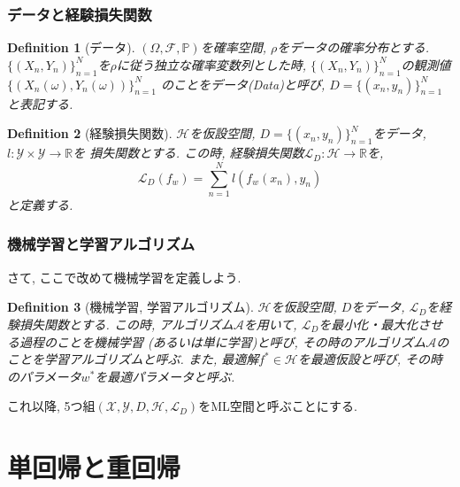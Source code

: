 \documentclass[dvipdfmx,11pt]{beamer}		%
\newtheorem{defi}{Definition}
\newcommand{\R}{\mathbb{R}}
\newcommand{\X}{\mathcal{X}}
\newcommand{\Y}{\mathcal{Y}}
\newcommand{\Hil}{\mathcal{H}}
\newcommand{\Loss}{\mathcal{L}_{D}}
\begin{document}
    \begin{frame}
        \frametitle{データと経験損失関数}
        \begin{defi}[データ]
            $(\Omega, \mathcal{F}, \mathbb{P})$を確率空間, $\rho$をデータの確率分布とする.
            $\{(X_n, Y_n)\}_{n = 1}^{N}$を$\rho$に従う独立な確率変数列とした時, $\{(X_n, Y_n)\}_{n = 1}^{N}$の観測値$\{(X_n(\omega), Y_n(\omega))\}_{n = 1}^{N}$
            のことをデータ(Data)と呼び, $D = \{(x_n, y_n)\}_{n = 1}^{N}$と表記する.
        \end{defi}
        \begin{defi}[経験損失関数]
            $\Hil$を仮設空間, $D = \{(x_n, y_n)\}_{n = 1}^{N}$をデータ, $l:\Y\times\Y\to\R$を
            損失関数とする. この時, 経験損失関数$\Loss:\Hil\to\R$を,
            \begin{equation*}
                \Loss(f_{w}) = \sum_{n = 1}^{N}l(f_{w}(x_n), y_n)
            \end{equation*}
            と定義する. 
        \end{defi}
    \end{frame}
    \begin{frame}
        \frametitle{機械学習と学習アルゴリズム}
        さて, ここで改めて機械学習を定義しよう.
        \begin{defi}[機械学習, 学習アルゴリズム]
            $\Hil$を仮設空間, $D$をデータ, $\Loss$を経験損失関数とする. この時, 
            アルゴリズム$\mathcal{A}$を用いて, $\Loss$を最小化・最大化させる過程のことを機械学習
            (あるいは単に学習)と呼び, その時のアルゴリズム$\mathcal{A}$のことを学習アルゴリズムと呼ぶ. 
            また, 最適解$f^{*}\in\Hil$を最適仮設と呼び, その時のパラメータ$w^{*}$を最適パラメータと呼ぶ. 
        \end{defi}
        これ以降, 5つ組$(\X, \Y, D, \Hil, \Loss)$をML空間と呼ぶことにする. 
    \end{frame}
    \section{単回帰と重回帰}
\end{document}
